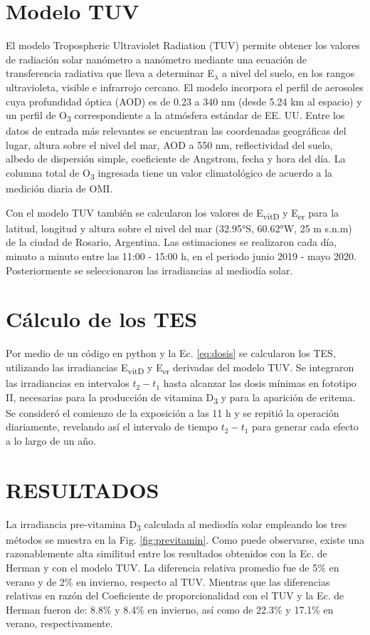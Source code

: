 \documentclass[10pt,twocolumn]{article}
\begin{document}
\section{Modelo TUV}
El modelo Tropospheric Ultraviolet Radiation (TUV) permite obtener los valores de radiación solar nanómetro a nanómetro mediante una ecuación de transferencia radiativa que lleva a determinar E$_\lambda$ a nivel del suelo, en los rangos ultravioleta, visible e infrarrojo cercano. El modelo incorpora el perfil de aerosoles cuya profundidad óptica (AOD) es de 0.23 a 340 nm (desde 5.24 km al espacio) y un perfil de O\textsubscript{3} correspondiente a la atmósfera estándar de EE. UU. Entre los datos de entrada más relevantes se encuentran las coordenadas geográficas del lugar, altura sobre el nivel del mar, AOD a 550 nm, reflectividad del suelo, albedo de dispersión simple, coeficiente de Angstrom, fecha y hora del día. La columna total de O\textsubscript{3} ingresada tiene un valor climatológico de acuerdo a la medición diaria de OMI.

Con el modelo TUV también se calcularon los valores de E\textsubscript{vitD} y E\textsubscript{er} para la latitud, longitud y altura sobre el nivel del mar (32.95°S, 60.62°W, 25 m s.n.m) de la ciudad de Rosario, Argentina. Las estimaciones se realizaron cada día, minuto a minuto entre las 11:00 - 15:00 h, en el periodo junio 2019 - mayo 2020. Posteriormente se seleccionaron las irradiancias al mediodía solar.

\section{Cálculo de los TES}
Por medio de un código en python y la Ec. \ref{eq:dosis} se calcularon los TES, utilizando las irradiancias E\textsubscript{vitD} y E\textsubscript{er} derivadas del modelo TUV. Se integraron las irradiancias en intervalos $t_2-t_1$ hasta alcanzar las dosis mínimas en fototipo II, necesarias para la producción de vitamina D\textsubscript{3} y para la aparición de eritema. Se consideró el comienzo de la exposición a las 11 h y se repitió la operación diariamente, revelando así el intervalo de tiempo $t_2-t_1$ para generar cada efecto a lo largo de un año.

\section{RESULTADOS}
La irradiancia pre-vitamina D\textsubscript{3} calculada al mediodía solar empleando los tres métodos se muestra en la Fig. \ref{fig:previtamin}. Como puede observarse, existe una razonablemente alta similitud entre los resultados obtenidos con la Ec. de Herman y con el modelo TUV. La diferencia relativa promedio fue de 5\% en verano y de 2\% en invierno, respecto al TUV. Mientras que las diferencias relativas en razón del Coeficiente de proporcionalidad con el TUV y la Ec. de Herman fueron de: 8.8\% y 8.4\% en invierno, así como de 22.3\% y 17.1\% en verano, respectivamente.
\end{document}
